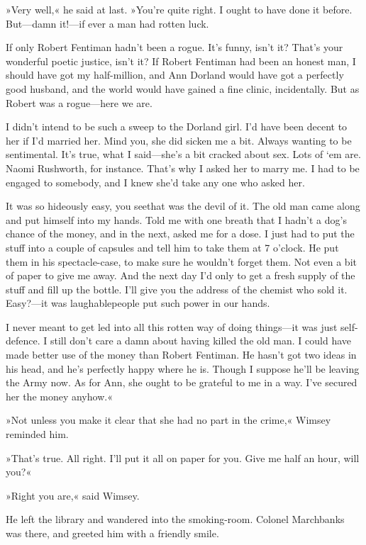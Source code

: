 »Very well,« he said at last. »You're quite right. I ought to have done it before. But—damn it!—if ever a man had rotten luck\textellipsis.

If only Robert Fentiman hadn't been a rogue. It's funny, isn't it? That's your wonderful poetic justice, isn't it? If Robert Fentiman had been an honest man, I should have got my half-million, and Ann Dorland would have got a perfectly good husband, and the world would have gained a fine clinic, incidentally. But as Robert was a rogue—here we are\textellipsis.

I didn't intend to be such a sweep to the Dorland girl. I'd have been decent to her if I'd married her. Mind you, she did sicken me a bit. Always wanting to be sentimental. It's true, what I said—she's a bit cracked about sex. Lots of `em are. Naomi Rushworth, for instance. That's why I asked her to marry me. I had to be engaged to somebody, and I knew she'd take any one who asked her\textellipsis.

It was so hideously easy, you see\textellipsis that was the devil of it. The old man came along and put himself into my hands. Told me with one breath that I hadn't a dog's chance of the money, and in the next, asked me for a dose. I just had to put the stuff into a couple of capsules and tell him to take them at 7 o'clock. He put them in his spectacle-case, to make sure he wouldn't forget them. Not even a bit of paper to give me away. And the next day I'd only to get a fresh supply of the stuff and fill up the bottle. I'll give you the address of the chemist who sold it. Easy?—it was laughable\textellipsis people put such power in our hands\textellipsis .

I never meant to get led into all this rotten way of doing things—it was just self-defence. I still don't care a damn about having killed the old man. I could have made better use of the money than Robert Fentiman. He hasn't got two ideas in his head, and he's perfectly happy where he is. Though I suppose he'll be leaving the Army now\textellipsis . As for Ann, she ought to be grateful to me in a way. I've secured her the money anyhow.«

»Not unless you make it clear that she had no part in the crime,« Wimsey reminded him.

»That's true. All right. I'll put it all on paper for you. Give me half an hour, will you?«

»Right you are,« said Wimsey.

He left the library and wandered into the smoking-room. Colonel Marchbanks was there, and greeted him with a friendly smile.

